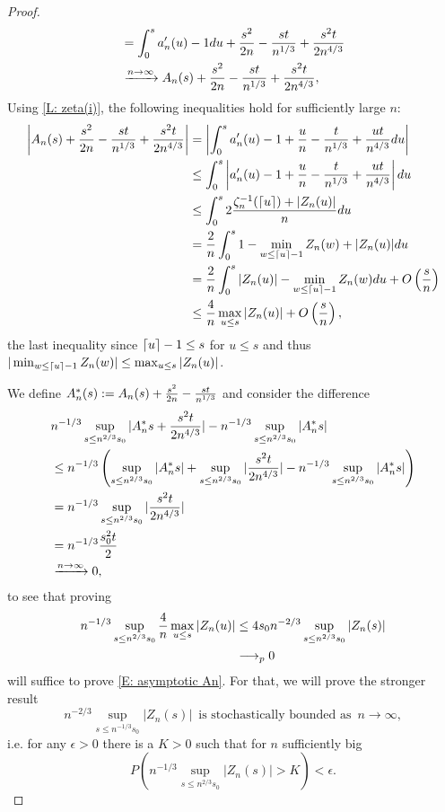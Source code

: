\begin{proof}
\begin{align*}
	&= \int_{0}^{s} a'_n(u) - 1 du + \frac{s^2}{2n} - \frac{st}{n^{1 / 3}} + \frac{s^2t}{2n^{4 / 3}} \\
	&\xrightarrow{n \rightarrow \infty} A_n(s) + \frac{s^2}{2n} - \frac{st}{n^{1 / 3}} + \frac{s^2t}{2n^{4 / 3}},
	\end{align*}
	Using \ref{L: zeta(i)}, the following inequalities hold for sufficiently large $n$:
    \begin{align*}
    \left| A_n(s) + \frac{s^2}{2n} - \frac{st}{n^{1 / 3}}  + \frac{s^2t}{2n^{4 / 3}}  \right| 
    &= \left| \int_{0}^{s} a'_n(u) - 1 + \frac{u}{n} - \frac{t}{n^{1 / 3}} + \frac{ut}{n^{4 / 3}} du \right| \\
    &\leq \int_{0}^{s} \left|a'_n(u) - 1 + \frac{u}{n} - \frac{t}{n^{1 / 3}} + \frac{ut}{n^{4 / 3}} \right| du \\
    &\leq \int_{0}^{s} 2 \frac{\zeta^{-1}_n(\lceil u\rceil) + |Z_n(u)|}{n} du \\
    &= \frac{2}{n}  \int_{0}^{s} 1-\min_{w \leq \lceil u\rceil-1} Z_n(w)  + |Z_n(u)| du \\
    &= \frac{2}{n}  \int_{0}^{s} |Z_n(u)| - \min_{w \leq \lceil u\rceil-1} Z_n(w) du + O\left(\frac{s}{n}\right) \\
    &\leq \frac{4}{n} \max_{u \leq s} |Z_n(u)| + O\left(\frac{s}{n}\right),
    \end{align*}
    the last inequality since $\lceil u\rceil-1 \leq s$ for $u\leq s$ and thus $|\min_{w \leq \lceil u\rceil-1}Z_n(w)| \leq \max_{u \leq s}|Z_n(u)|$.
    
    We define $A^*_n(s) := A_n(s) + \frac{s^2}{2n} - \frac{st}{n^{1 / 3}}$ and consider the difference
    \begin{align*}
    &n^{-1 / 3}\sup_{s \leq n^{2 / 3} s_0 } | A^*_n{s} + \frac{s^2t}{2n^{4 / 3}}  | - n^{-1 / 3}\sup_{s \leq n^{2 / 3} s_0 } | A^*_n{s} | \\
    &\leq n^{-1 / 3} \left( \sup_{s \leq n^{2 / 3} s_0 } | A^*_n{s} | + \sup_{s \leq n^{2 / 3} s_0 } |\frac{s^2t}{2n^{4 / 3}}|  - n^{-1 / 3}\sup_{s \leq n^{2 / 3} s_0 } | A^*_n{s} | \right) \\
    &= n^{-1 / 3} \sup_{s \leq n^{2 / 3} s_0 } |\frac{s^2t}{2n^{4 / 3}}| \\
    &= n^{-1 / 3} \frac{s_0^2t}{2} \\
    &\xrightarrow{n \rightarrow \infty} 0,
    \end{align*}
    to see that proving
    \begin{align*}
    n^{-1 / 3} \sup_{s \leq n^{2 / 3} s_0 } \frac{4}{n} \max_{u \leq s} |Z_n(u)| 
    &\leq 4 s_0 n^{-2 / 3} \sup_{s \leq n^{2 / 3} s_0 } |Z_n(s)| \\
    &\longrightarrow_p 0 
    \end{align*}
    will suffice to prove \ref{E: asymptotic An}.
    For that, we will prove the stronger result 
    \begin{equation}
    n^{-2/3} \sup_{s\leq n^{-1/3} s_0} |Z_n(s)| 
    \enspace \text{is stochastically bounded as} \enspace n \rightarrow \infty ,
    \end{equation} 
    i.e. for any 
    $ \epsilon > 0 $ 
    there is a
    $ K > 0 $
    such that for $n$ sufficiently big 
    \begin{equation} \label{E: stoch bounded}
    P\left( n^{-1/3} \sup_{s\leq n^{2/3} s_0} |Z_n(s)| > K \right) < \epsilon. 
    \end{equation}
    

\end{proof}
